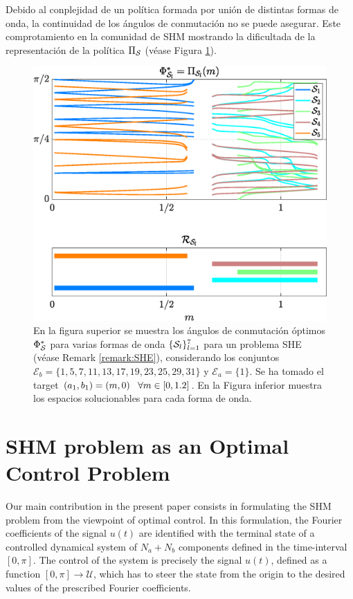 \documentclass[twocolumn]{autart}    %
\begin{document}
Debido al conplejidad de un política formada por unión de  distintas formas de onda, la continuidad de los ángulos de conmutación no se puede asegurar. Este comprotamiento en la comunidad de SHM \cite{Agelidis2008,Dahidah2008,Dahidah2015,Yang2017} mostrando la dificultada de la representación de la política $\Pi_{\mathcal{S}}$ (véase Figura \ref{fig:chaos_policy}).
	

\begin{figure}
	\centering
	\includegraphics[scale=0.35]{img/fig01a.eps}
	\caption{En la figura superior se muestra los ángulos de conmutación óptimos $\Phi^*_{\mathcal{S}}$ para varias formas de onda $\{\mathcal{S}_l\}_{l=1}^7$ para un problema SHE (véase Remark \ref{remark:SHE}), considerando los conjuntos   $\mathcal{E}_b = \{1,     5,     7,    11 ,   13  ,  17  ,  19   , 23 ,   25  ,  29  ,  31\}$ y $\mathcal{E}_a = \{1\}$. Se ha tomado el  target $(a_1,b_1) = (m,0) \hspace{0.5em} \forall m \in [0,1.2]$. En la Figura inferior muestra los espacios solucionables para cada forma de onda.}
	\label{fig:chaos_policy}
\end{figure}

\JOEnd

\section{SHM problem as an Optimal Control Problem}\label{sec:Contributions}

Our main contribution in the present paper consists in formulating the SHM problem from the viewpoint of optimal control. In this formulation, the Fourier coefficients of the signal $u(t)$ are identified with the terminal state of a controlled dynamical system of $N_a+N_b$ components defined in the time-interval $[0,\pi]$.  The control of the system is precisely the signal $u(t)$, defined as a function $[0,\pi]\to \mathcal{U}$, which has to steer the state from the origin to the desired values of the prescribed Fourier coefficients. 
\end{document}
